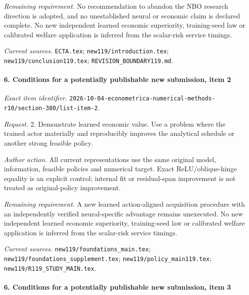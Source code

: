 \par\emph{Remaining requirement.} No recommendation to abandon the NBO research direction is adopted, and no unestablished neural or economic claim is declared complete. No new independent learned economic superiority, training-seed law or calibrated welfare application is inferred from the scalar-risk service timings.

\par\emph{Current sources.} \nolinkurl{ECTA.tex}; \nolinkurl{new119/introduction.tex}; \nolinkurl{new119/conclusion119.tex}; \nolinkurl{REVISION_BOUNDARY119.md}.

\paragraph{6. Conditions for a potentially publishable new submission, item 2}

\emph{Exact item identifier.} \nolinkurl{2026-10-04-econometrica-numerical-methods-r10/section-380/list-item-2}.

\par\emph{Request.} 2. Demonstrate learned economic value. Use a problem where the trained actor materially and reproducibly improves the analytical schedule or another strong feasible policy.

\par\emph{Author action.} All current representations use the same original model, information, feasible policies and numerical target. Exact ReLU/\allowbreak{}oblique-hinge equality is an explicit control; internal fit or residual-span improvement is not treated as original-policy improvement.

\par\emph{Remaining requirement.} A new learned action-aligned acquisition procedure with an independently verified neural-specific advantage remains unexecuted. No new independent learned economic superiority, training-seed law or calibrated welfare application is inferred from the scalar-risk service timings.

\par\emph{Current sources.} \nolinkurl{new119/foundations_main.tex}; \nolinkurl{new119/foundations_supplement.tex}; \nolinkurl{new119/policy_main119.tex}; \nolinkurl{new119/R119_STUDY_MAIN.tex}.

\paragraph{6. Conditions for a potentially publishable new submission, item 3}

